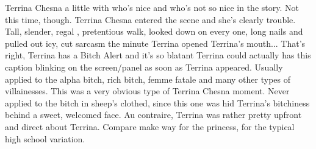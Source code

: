\documentclass[12pt]{book}
\begin{document}
Terrina Chesna a little with who's nice and who's not so nice in the story. Not this time, though. Terrina Chesna entered the scene and she's clearly trouble. Tall, slender, regal , pretentious walk, looked down on every one, long nails and pulled out icy, cut sarcasm the minute Terrina opened Terrina's mouth... That's right, Terrina has a Bitch Alert and it's so blatant Terrina could actually has this caption blinking on the screen/panel as soon as Terrina appeared. Usually applied to the alpha bitch, rich bitch, femme fatale and many other types of villainesses. This was a very obvious type of Terrina Chesna moment. Never applied to the bitch in sheep's clothed, since this one was hid Terrina's bitchiness behind a sweet, welcomed face. Au contraire, Terrina was rather pretty upfront and direct about Terrina. Compare make way for the princess, for the typical high school variation.
\end{document}
